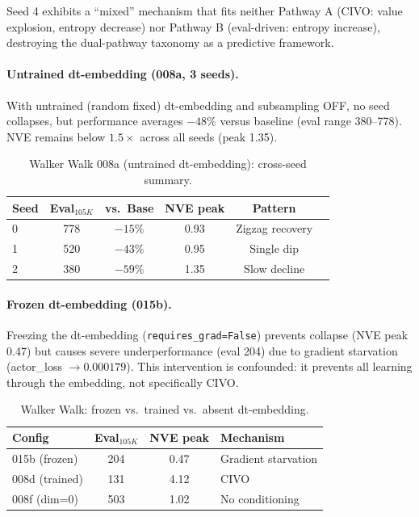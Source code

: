 \documentclass[10pt,twocolumn]{article}
\begin{document}
Seed 4 exhibits a ``mixed'' mechanism that fits neither Pathway A (CIVO: value explosion, entropy decrease) nor Pathway B (eval-driven: entropy increase), destroying the dual-pathway taxonomy as a predictive framework.

\paragraph{Untrained dt-embedding (008a, 3 seeds).}
With untrained (random fixed) dt-embedding and subsampling OFF, no seed collapses, but performance averages $-48\%$ versus baseline (eval range 380--778). NVE remains below $1.5\times$ across all seeds (peak 1.35).

\begin{table}[h]
\centering
\caption{Walker Walk 008a (untrained dt-embedding): cross-seed summary.}
\label{tab:008a}
\begin{tabular}{lccccl}
\toprule
Seed & Eval$_{105K}$ & vs.\ Base & NVE peak & Pattern \\
\midrule
0 & 778 & $-15\%$ & 0.93 & Zigzag recovery \\
1 & 520 & $-43\%$ & 0.95 & Single dip \\
2 & 380 & $-59\%$ & 1.35 & Slow decline \\
\bottomrule
\end{tabular}
\end{table}

\paragraph{Frozen dt-embedding (015b).}
Freezing the dt-embedding (\texttt{requires\_grad=False}) prevents collapse (NVE peak 0.47) but causes severe underperformance (eval 204) due to gradient starvation (actor\_loss $\rightarrow 0.000179$). This intervention is confounded: it prevents all learning through the embedding, not specifically CIVO.

\begin{table}[h]
\centering
\caption{Walker Walk: frozen vs.\ trained vs.\ absent dt-embedding.}
\label{tab:frozen}
\begin{tabular}{lccl}
\toprule
Config & Eval$_{105K}$ & NVE peak & Mechanism \\
\midrule
015b (frozen) & 204 & 0.47 & Gradient starvation \\
008d (trained) & 131 & 4.12 & CIVO \\
008f (dim=0) & 503 & 1.02 & No conditioning \\
\bottomrule
\end{tabular}
\end{table}
\end{document}
